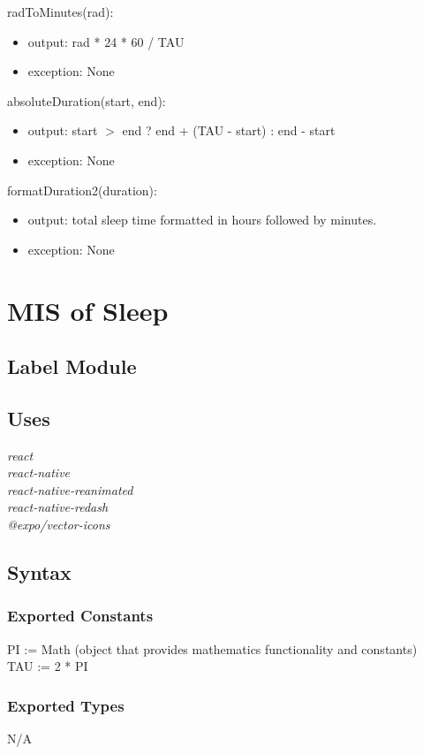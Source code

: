 \documentclass[12pt, titlepage]{article}
\begin{document}
\noindent radToMinutes(rad):
\begin{itemize}
	\item output: rad * 24 * 60 / TAU
	\item exception: None 
\end{itemize}

\noindent absoluteDuration(start, end):
\begin{itemize}
	\item output: start $>$ end ? end + (TAU - start) : end - start  
	\item exception: None 
\end{itemize}

\noindent formatDuration2(duration):
\begin{itemize}
	\item output: total sleep time formatted in hours followed by minutes.
	\item exception: None 
\end{itemize}

\section{MIS of Sleep} \label{Module} 

\subsection{Label Module}

\subsection{Uses}
{\textit{react}}\\
{\textit{react-native}}\\
{\textit{react-native-reanimated}}\\
{\textit{react-native-redash}}\\
{\textit{@expo/vector-icons}}

\subsection{Syntax}

\subsubsection{Exported Constants}
PI := Math (object that provides mathematics functionality and constants)\\
TAU := 2 * PI
\subsubsection{Exported Types}
N/A
\end{document}
